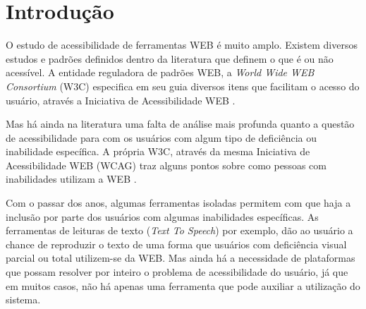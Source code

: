 \documentclass[
	12pt,				%
	oneside,			%
	a4paper,			%
	english,			%
	brazil				%
	]{abntex2ppgsi}
\begin{document}
\tableofcontents*
\cleardoublepage

\textual



% 
%
%
\chapter{Introdução}
\label{sec:intro}


O estudo de acessibilidade de ferramentas WEB é muito amplo. Existem diversos estudos e padrões definidos dentro da literatura que definem o que é ou não acessível. A entidade reguladora de padrões WEB, a \textit{World Wide WEB Consortium} (W3C) especifica em seu guia diversos itens que facilitam o acesso do usuário, através a Iniciativa de Acessibilidade WEB . 

Mas há ainda na literatura uma falta de análise mais profunda quanto a questão de acessibilidade para com os usuários com algum tipo de deficiência ou inabilidade específica. A própria W3C, através da mesma Iniciativa de Acessibilidade WEB (WCAG) traz alguns pontos sobre como pessoas com inabilidades utilizam a WEB .

Com o passar dos anos, algumas ferramentas isoladas permitem com que haja a inclusão por parte dos usuários com algumas inabilidades específicas. As ferramentas de leituras de texto (\textit{Text To Speech}) por exemplo, dão ao usuário a chance de reproduzir o texto de uma forma que usuários com deficiência visual parcial ou total utilizem-se da WEB. Mas ainda há a necessidade de plataformas que possam resolver por inteiro o problema de acessibilidade do usuário, já que em muitos casos, não há apenas uma ferramenta que pode auxiliar a utilização do sistema. 

\end{document}
